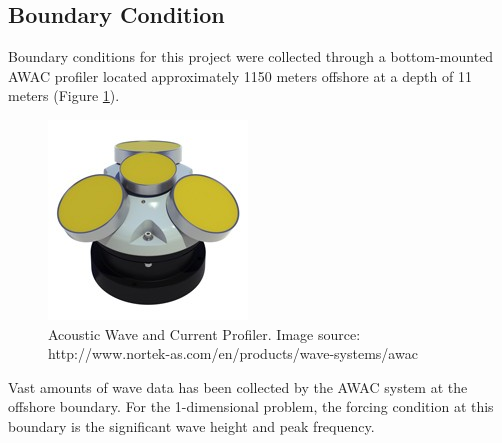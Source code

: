 \subsection{Boundary Condition}
\label{BC}

	Boundary conditions for this project were collected through a bottom-mounted AWAC profiler located approximately 1150 meters offshore at a depth of 11 meters (Figure \ref{AWAC}).

	\begin{figure}[h]
		\centering
		\includegraphics[width=.40\linewidth]{img/AWAC.jpg}
		\caption{Acoustic Wave and Current Profiler. Image source: http://www.nortek-as.com/en/products/wave-systems/awac}
		\label{AWAC}
	\end{figure}
	
	Vast amounts of wave data has been collected by the AWAC system at the offshore boundary. For the 1-dimensional problem, the forcing condition at this boundary is the significant wave height and peak frequency.